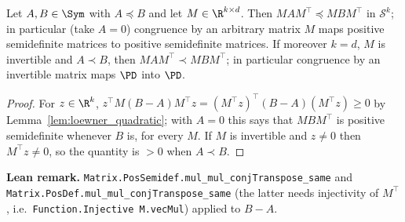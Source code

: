 \begin{lemma}\label{lem:loewner_congruence}
\leanok
{}
Let $A, B \in \Sym$ with $A \preceq B$ and let $M \in \R^{k \times d}$. Then
$M A M^\top \preceq M B M^\top$ in $\mathcal{S}^k$; in particular (take $A = 0$) congruence by
an arbitrary matrix $M$ maps positive semidefinite matrices to positive semidefinite matrices.
If moreover $k = d$, $M$ is invertible and
$A \prec B$, then $M A M^\top \prec M B M^\top$; in particular congruence by an invertible
matrix maps $\PD$ into $\PD$.
\end{lemma}

\begin{proof}
\leanok
{}
For $z \in \R^k$, $z^\top M (B-A) M^\top z = (M^\top z)^\top (B - A) (M^\top z) \ge 0$ by
Lemma~\ref{lem:loewner_quadratic}; with $A = 0$ this says that $MBM^\top$ is positive
semidefinite whenever $B$ is, for every $M$. If $M$ is invertible and $z \ne 0$ then $M^\top z \ne 0$, so
the quantity is $> 0$ when $A \prec B$.
\end{proof}

\textbf{Lean remark.} \texttt{Matrix.PosSemidef.mul\_mul\_conjTranspose\_same} and
\texttt{Matrix.PosDef.mul\_mul\_conjTranspose\_same} (the latter needs injectivity of
$M^\top$, i.e.\ \texttt{Function.Injective M.vecMul}) applied to $B - A$.

